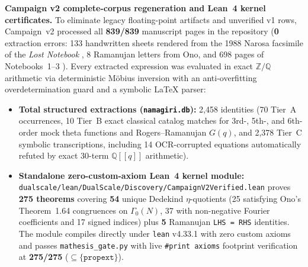 \noindent\textbf{Campaign v2 complete-corpus regeneration and Lean~4 kernel certificates.}
To eliminate legacy floating-point artifacts and unverified v1 rows,
Campaign~v2 processed all \textbf{839/839} manuscript pages in the repository
(\textbf{0} extraction errors: 133 handwritten sheets rendered from the 1988
Narosa facsimile of the \emph{Lost Notebook} \cite{Narosa1988}, 8 Ramanujan
letters from Ono, and 698 pages of Notebooks~1--3 \cite{AndrewsBerndt}).
Every extracted expression was evaluated in exact $\mathbb{Z}/\mathbb{Q}$
arithmetic via deterministic M\"{o}bius inversion with an anti-overfitting
overdetermination guard and a symbolic \LaTeX{} parser:
\begin{itemize}
  \item \textbf{Total structured extractions (\texttt{namagiri.db}):}
    2,458 identities (70 Tier~A occurrences, 10 Tier~B exact classical catalog
    matches for 3rd-, 5th-, and 6th-order mock theta functions and
    Rogers--Ramanujan $G(q)$, and 2,378 Tier~C symbolic transcriptions,
    including 14 OCR-corrupted equations automatically refuted by exact
    30-term $\mathbb{Q}[[q]]$ arithmetic).
  \item \textbf{Standalone zero-custom-axiom Lean~4 kernel module:}
    \texttt{dualscale/lean/DualScale/Discovery/CampaignV2Verified.lean}
    proves \textbf{275 theorems} covering \textbf{54} unique Dedekind
    $\eta$-quotients (25 satisfying Ono's Theorem~1.64 congruences on
    $\Gamma_0(N)$, 37 with non-negative Fourier coefficients and 17 signed
    indices) plus \textbf{5} Ramanujan \texttt{LHS = RHS} identities.
    The module compiles directly under \texttt{lean} v4.33.1 with zero custom
    axioms and passes \texttt{mathesis\_gate.py} with live
    \texttt{\#print axioms} footprint verification at \textbf{275/275}
    ($\subseteq \{\texttt{propext}\}$).
\end{itemize}

